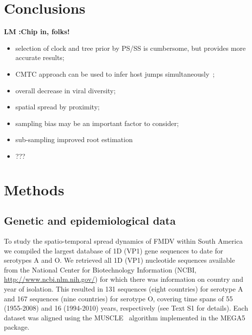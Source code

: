 \documentclass[10pt]{article}
\begin{document}
\section*{Conclusions}
{\bf LM :Chip in, folks!}
\begin{itemize}
 \item selection of clock and tree prior by PS/SS is cumbersome, but provides more accurate results;
 \item CMTC approach can be used to infer host jumps simultaneously~\cite{hall2013};
 \item overall decrease in viral diversity;
 \item spatial spread by proximity;
 \item sampling bias may be an important factor to consider;
 \item sub-sampling improved root estimation %
 \item ???
\end{itemize}

\section*{Methods}

\subsection*{Genetic and epidemiological data}

To study the spatio-temporal spread dynamics of FMDV within South America we compiled the largest database of 1D (VP1) gene sequences to date for serotypes A and O.
We retrieved all 1D (VP1) nucleotide sequences available from the National Center for Biotechnology Information (NCBI, \url{ http://www.ncbi.nlm.nih.gov/}) for which there was information on country and year of isolation.
This resulted in 131 sequences (eight countries) for serotype A and 167 sequences (nine countries) for serotype O, covering time spans of 55 (1955-2008) and 16 (1994-2010) years, respectively (see Text S1 for details).
Each dataset was aligned using the MUSCLE~\cite{muscle} algorithm implemented in the MEGA5~\cite{MEGA} package.
\end{document}
